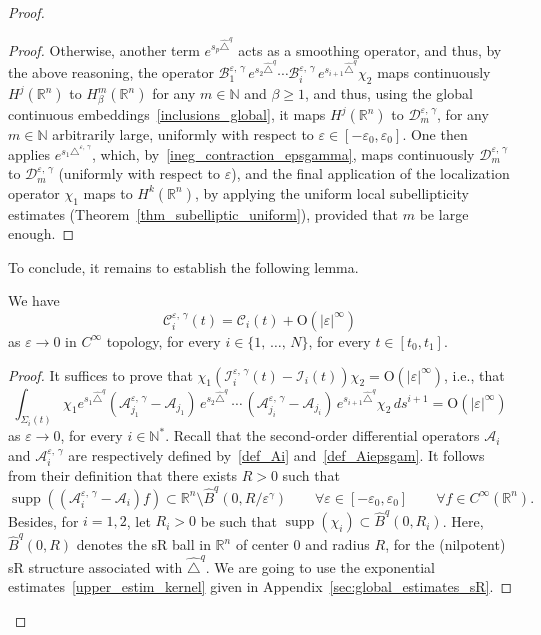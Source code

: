 \documentclass[AHL,Unicode,published]{cedram}
\newcommand*\R{\mathbb{R}}
\newcommand*\N{\mathbb{N}}
\newcommand{\calA}{\mathcal{A}}
\newcommand{\calC}{\mathcal{C}}
\newcommand{\calI}{\mathcal{I}}
\newcommand{\calB}{\mathcal{B}}
\newcommand{\calD}{\mathcal{D}}
\newcommand{\rmO}{\mathrm{O}}
\DeclareMathOperator{\supp}{supp}
\renewcommand{\geq}{\geqslant}
\let\oldforall\forall
\renewcommand*{\forall}{\mathrel{\oldforall}}
\begin{document}
\begin{proof}
\begin{proof}
Otherwise, another term $e^{s_p\widehat{\triangle}^q}$ acts as a smoothing operator, and thus, by the above reasoning, the operator $\calB_{1}^{\varepsilon,\,\gamma} \, e^{s_2 \widehat{\triangle}^{q}}
\cdots \calB_i^{\varepsilon,\,\gamma} \, e^{s_{i+1}
\widehat{\triangle}^{q}} \chi_2$ maps continuously $H^j(\R^n)$ to $H^m_\beta(\R^n)$ for any $m\in\N$ and $\beta\geq 1$, and thus, using the global continuous embeddings~\eqref{inclusions_global}, it maps $H^j(\R^n)$ to $\calD^{\varepsilon,\,\gamma}_m$, for any $m\in\N$ arbitrarily large, uniformly with respect to $\varepsilon\in[-\varepsilon_0,\varepsilon_0]$. One then applies $e^{s_1\triangle^{\varepsilon,\,\gamma}}$, which, by~\eqref{ineg_contraction_epsgamma}, maps continuously $\calD^{\varepsilon,\,\gamma}_m$ to $\calD^{\varepsilon,\,\gamma}_m$ (uniformly with respect to $\varepsilon$), and the final application of the localization operator $\chi_1$ maps to $H^k(\R^n)$, by applying the uniform local subellipticity estimates (Theorem~\ref{thm_subelliptic_uniform}), provided that $m$ be large enough.
\end{proof}

To conclude, it remains to establish the following lemma.

\begin{lemm}\label{lemm6.10}
We have
\[
\calC_i^{\varepsilon,\,\gamma}(t) = \calC_i(t) + \rmO(\vert\varepsilon\vert^\infty)
\]
as $\varepsilon\rightarrow 0$ in $C^\infty$ topology, for every $i\in\{1,\,\ldots,\,N\}$, for every $t\in[t_0,t_1]$.
\end{lemm}

\begin{proof}
It suffices to prove that $\chi_1 (\calI_i^{\varepsilon,\,\gamma}(t) - \calI_i(t))\chi_2 = \rmO(\vert\varepsilon\vert^\infty)$, i.e., that
\begin{equation}\label{int_diffA}
\int_{\Sigma_i(t)} \chi_1 e^{s_1 \widehat{\triangle}^{q}} \left(\calA_{j_1}^{\varepsilon,\,\gamma} - \calA_{j_1}\right) \, e^{s_2 \widehat{\triangle}^{q}}\,\cdots\,\left(\calA_{j_i}^{\varepsilon,\,\gamma} - \calA_{j_i}\right) \, e^{s_{i+1} \widehat{\triangle}^{q}} \chi_2 \, ds^{i+1} = \rmO(\vert\varepsilon\vert^\infty)
\end{equation}
as $\varepsilon\rightarrow 0$, for every $i\in\N^*$. Recall that the second-order differential operators $\calA_i$ and $\calA_i^{\varepsilon,\,\gamma}$ are respectively defined by~\eqref{def_Ai} and~\eqref{def_Aiepsgam}. It follows from their definition that there exists $R>0$ such that
\[
\supp\left(\left(\calA_i^{\varepsilon,\,\gamma} - \calA_i\right) f \right) \subset \R^n \setminus\widehat{B}^q(0,R/\varepsilon^\gamma) \qquad \forall \varepsilon\in[-\varepsilon_0,\varepsilon_0]\qquad\forall f\in C^\infty(\R^n).
\]
Besides, for $i=1,2$, let $R_i>0$ be such that $\supp(\chi_i)\subset \widehat{B}^q(0,R_i)$. Here, $\widehat{B}^q(0,R)$ denotes the sR ball in $\R^n$ of center $0$ and radius $R$, for the (nilpotent) sR structure associated with $\widehat{\triangle}^{q}$. We are going to use the exponential estimates~\eqref{upper_estim_kernel} given in Appendix~\ref{sec:global_estimates_sR}.


\end{proof}
\end{proof}
\end{document}
